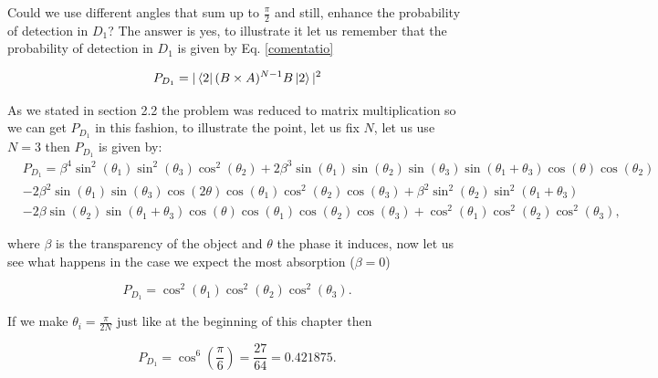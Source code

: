\documentclass[12pt]{book}
\begin{document}
Could we use different angles that sum up to $\frac{\pi}{2}$ and still, enhance the probability of detection in $D_{1}$? The answer is yes, to illustrate it let us remember that the probability of detection in $D_{1}$ is given by Eq. \ref{comentatio}

\begin{equation*}
P_{D_{1}}=|\bra{2} (B \times A)^{N-1}B \ket{2}|^2
\end{equation*}

As we stated in section 2.2 the problem was reduced to matrix multiplication so we can get $P_{D_{1}}$ in this fashion, to illustrate the point, let us fix $N$, let us use $N=3$ then $P_{D_{1}}$ is given by:
\small
\begin{align*}
&P_{D_{1}}=\beta^{4} \sin^{2}{\left(\theta_{1} \right)} \sin^{2}{\left(\theta_{3} \right)} \cos^{2}{\left(\theta_{2} \right)} + 2 \beta^{3} \sin{\left(\theta_{1} \right)} \sin{\left(\theta_{2} \right)} \sin{\left(\theta_{3} \right)} \sin{\left(\theta_{1} + \theta_{3} \right)} \cos{\left(\theta \right)} \cos{\left(\theta_{2} \right)} \\
 & - 2 \beta^{2} \sin{\left(\theta_{1} \right)} \sin{\left(\theta_{3} \right)} \cos{\left(2 \theta \right)} \cos{\left(\theta_{1} \right)} \cos^{2}{\left(\theta_{2} \right)} \cos{\left(\theta_{3} \right)} + \beta^{2} \sin^{2}{\left(\theta_{2} \right)} \sin^{2}{\left(\theta_{1} + \theta_{3} \right)} \\
 & - 2 \beta \sin{\left(\theta_{2} \right)} \sin{\left(\theta_{1} + \theta_{3} \right)} \cos{\left(\theta \right)} \cos{\left(\theta_{1} \right)} \cos{\left(\theta_{2} \right)} \cos{\left(\theta_{3} \right)} + \cos^{2}{\left(\theta_{1} \right)} \cos^{2}{\left(\theta_{2} \right)} \cos^{2}{\left(\theta_{3} \right)},
\end{align*}
\normalsize

where $\beta$ is the transparency of the object and $\theta$ the phase it induces, now let us see what happens in the case we expect the most absorption ($\beta=0$) 

\begin{equation}
P_{D_{1}}=\cos^{2}{\left(\theta_{1} \right)} \cos^{2}{\left(\theta_{2} \right)} \cos^{2}{\left(\theta_{3} \right)}.
\end{equation}

If we make $\theta_{i}=\frac{\pi}{2N}$ just like at the beginning of this chapter then

\begin{equation}
P_{D_{1}}=\cos^{6}{\left(\frac{\pi}{6} \right)}=\frac{27}{64}=0.421875.
\end{equation} 
\end{document}

